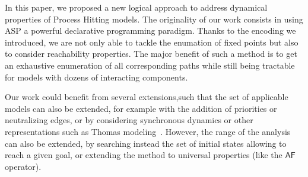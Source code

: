 In this paper, we proposed a new logical approach to address dynamical properties of Process Hitting models. The originality of our work consists in using ASP a powerful declarative programming paradigm. Thanks to the encoding we introduced, we are not only able to tackle the enumation of fixed points but also to consider reachability properties. The major benefit of such a method is to get an exhaustive enumeration of all corresponding paths while still being tractable for models with dozens of interacting components.



Our work could benefit from several extensions,such that the set of applicable models can also be extended,
for example with the addition
of priorities or neutralizing edges,
or by considering synchronous dynamics or other representations
such as Thomas modeling~\cite{Thomas73}.
However, the range of the analysis can also be extended,
by searching instead the set of initial states
allowing to reach a given goal,
or extending the method to universal properties (like the $\mathsf{AF}$ operator).
